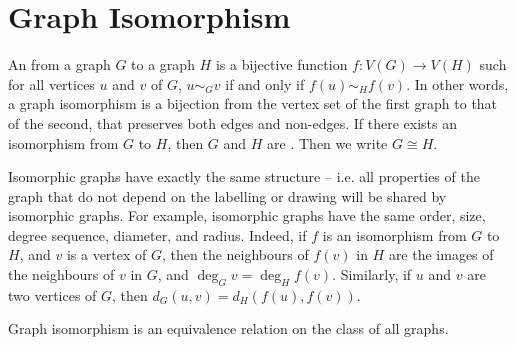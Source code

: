\section{Graph Isomorphism}\label{sec:Isomorphism}

An  from a graph $G$ to a graph $H$ is a bijective function $f \colon V(G) \to V(H)$ such for all vertices $u$ and $v$ of $G$, $u \sim_G v$ if and only if $f(u) \sim_H f(v)$. In other words, a graph isomorphism is a bijection from the vertex set of the first graph to that of the second, that preserves both edges and non-edges. If there exists an isomorphism from $G$ to $H$, then $G$ and $H$ are . Then we write $G \cong H$.

Isomorphic graphs have exactly the same structure -- i.e. all properties of the graph that do not depend on the labelling or drawing will be shared by isomorphic graphs. For example, isomorphic graphs have the same order, size, degree sequence, diameter, and radius. Indeed, if $f$ is an isomorphism from $G$ to $H$, and $v$ is a vertex of $G$, then the neighbours of $f(v)$ in $H$ are the images of the neighbours of $v$ in $G$, and $\deg_G v = \deg_H f(v)$. Similarly, if $u$ and $v$ are two vertices of $G$, then $d_G(u, v) = d_H(f(u), f(v))$.

\begin{Theorem}
Graph isomorphism is an equivalence relation on the class of all graphs.
\end{Theorem}

